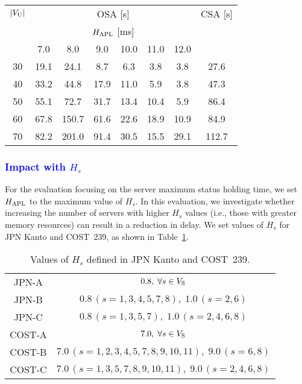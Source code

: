 \documentclass[10pt, letterpaper]{IEEEtran}
\newcommand\blue[1]{\textcolor{blue}{#1}}
\begin{document}
\begin{CJK}{UTF8}{ipxm}
\begin{table}[t]
  \begin{center}
    \begin{tabular}{c|cccccc|c}
      \hline
      $|V_{\rm{U}}|$ & \multicolumn{6}{c|}{OSA [s]} & CSA [s] \\ \cline{2-7}
       & \multicolumn{6}{c|}{$H_{\rm{APL}}$ [ms]} & \\
       & 7.0 & 8.0 & 9.0 & 10.0 & 11.0 & 12.0 &  \\
      \hline
      30 & 19.1 &  24.1 &  8.7 &  6.3 &  3.8 &  3.8 &  27.6 \\
      40 & 33.2 &  44.8 & 17.9 & 11.0 &  5.9 &  3.8 &  47.3 \\
      50 & 55.1 &  72.7 & 31.7 & 13.4 & 10.4 &  5.9 &  86.4 \\
      60 & 67.8 & 150.7 & 61.6 & 22.6 & 18.9 & 10.9 &  84.9 \\
      70 & 82.2 & 201.0 & 91.4 & 30.5 & 15.5 & 29.1 & 112.7 \\
      \hline
    \end{tabular}
  \end{center}
\end{table}

\subsubsection{\blue{Impact with $H_s$}}
For the evaluation focusing on the server maximum status holding time, we set $H_{\rm APL}$ to the maximum value of $H_s$.
In this evaluation, we investigate whether increasing the number of servers with higher $H_s$ values (i.e., those with greater memory resources) can result in a reduction in delay.
We set values of $H_s$ for JPN Kanto and COST~239, as shown in Table~\ref{tab:condition_hs_JPN_COST}.
\begin{table}[t]
  \caption{Values of $H_s$ defined in JPN Kanto and COST~239.}
  \label{tab:condition_hs_JPN_COST}
  \begin{center}
    \begin{tabular}{c|c}
      \hline
      JPN-A & $0.8,\; \forall s \in V_{\rm S}$ \\
      JPN-B & $0.8\,(s=1,3,4,5,7,8),\;1.0\,(s=2,6)$ \\
      JPN-C & $0.8\,(s=1,3,5,7),\;1.0\,(s=2,4,6,8)$ \\
      \hline
      COST-A & $7.0,\; \forall s \in V_{\rm S}$ \\
      COST-B & $7.0\,(s=1,2,3,4,5,7,8,9,10,11),\;9.0\,(s=6,8)$ \\
      COST-C & $7.0\,(s=1,3,5,7,8,9,10,11),\;9.0\,(s=2,4,6,8)$ \\
      \hline
    \end{tabular}
  \end{center}
\end{table}


\end{CJK}
\end{document}
